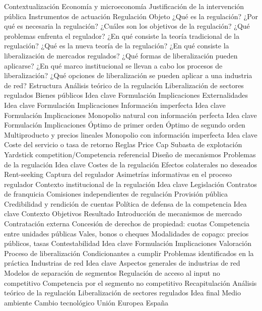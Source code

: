 \documentclass{nuevotema}
\begin{document}
\begin{esquema}[enumerate]
	\1[] 
		\2 Contextualización
			\3 Economía y microeconomía
			\3 Justificación de la intervención pública
			\3 Instrumentos de actuación
			\3 Regulación
		\2 Objeto
			\3 ¿Qué es la regulación?
			\3 ¿Por qué es necesaria la regulación?
			\3 ¿Cuáles son los objetivos de la regulación?
			\3 ¿Qué problemas enfrenta el regulador?
			\3 ¿En qué consiste la teoría tradicional de la regulación?
			\3 ¿Qué es la nueva teoría de la regulación?
			\3 ¿En qué consiste la liberalización de mercados regulados?
			\3 ¿Qué formas de liberalización pueden aplicarse?
			\3 ¿En qué marco institucional se llevan a cabo los procesos de liberalización?
			\3 ¿Qué opciones de liberalización se pueden aplicar a una industria de red?
		\2 Estructura
			\3 Análisis teórico de la regulación
			\3 Liberalización de sectores regulados
	\1 
		\2 Bienes públicos
			\3 Idea clave
			\3 Formulación
			\3 Implicaciones
		\2 Externalidades
			\3 Idea clave
			\3 Formulación
			\3 Implicaciones
		\2 Información imperfecta
			\3 Idea clave
			\3 Formulación
			\3 Implicaciones
		\2 Monopolio natural con información perfecta
			\3 Idea clave
			\3 Formulación
			\3 Implicaciones
			\3 Óptimo de primer orden
			\3 Óptimo de segundo orden
			\3 Multiproducto y precios lineales
		\2 Monopolio con información imperfecta
			\3 Idea clave
			\3 Coste del servicio o tasa de retorno
			\3 Reglas Price Cap
			\3 Subasta de explotación
			\3 Yardstick competition/Competencia referencial
			\3 Diseño de mecanismos
		\2 Problemas de la regulación
			\3 Idea clave
			\3 Costes de la regulación
			\3 Efectos colaterales no deseados
			\3 Rent-seeking
			\3 Captura del regulador
			\3 Asimetrías informativas en el proceso regulador
		\2 Contexto institucional de la regulación
			\3 Idea clave
			\3 Legislación
			\3 Contratos de franquicia
			\3 Comisiones independientes de regulación
			\3 Provisión pública
			\3 Credibilidad y rendición de cuentas
			\3 Política de defensa de la competencia
	\1 
		\2 Idea clave
			\3 Contexto
			\3 Objetivos
			\3 Resultado
		\2 Introducción de mecanismos de mercado
			\3 Contratación externa
			\3 Concesión de derechos de propiedad: cuotas
			\3 Competencia entre unidades públicas
			\3 Vales, bonos o cheques
			\3 Modalidades de copago: precios públicos, tasas
		\2 Contestabilidad
			\3 Idea clave
			\3 Formulación
			\3 Implicaciones
			\3 Valoración
		\2 Proceso de liberalización
			\3 Condicionantes a cumplir
			\3 Problemas identificados en la práctica
		\2 Industrias de red
			\3 Idea clave
			\3 Aspectos generales de industrias de red
			\3 Modelos de separación de segmentos
			\3 Regulación de acceso al input no competitivo
			\3 Competencia por el segmento no competitivo
	\1[] 
		\2 Recapitulación
			\3 Análisis teórico de la regulación
			\3 Liberalización de sectores regulados
		\2 Idea final
			\3 Medio ambiente
			\3 Cambio tecnológico
			\3 Unión Europea
			\3 España
\end{esquema}
\end{document}
